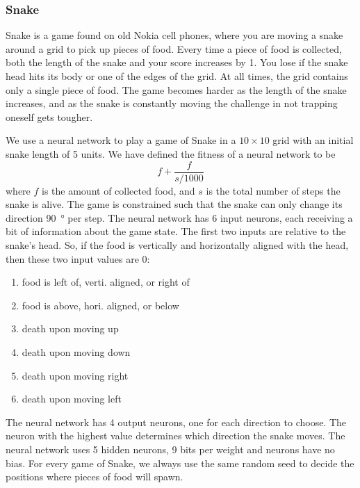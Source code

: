 \subsubsection{Snake}
Snake is a game found on old Nokia cell phones, where you are moving a snake around a grid to pick up pieces of food.
Every time a piece of food is collected, both the length of the snake and your score increases by 1.
You lose if the snake head hits its body or one of the edges of the grid.
At all times, the grid contains only a single piece of food.
The game becomes harder as the length of the snake increases, and as the snake is constantly moving the challenge in not trapping oneself gets tougher.

We use a neural network to play a game of Snake in a $10\times10$ grid with an initial snake length of 5 units.
We have defined the fitness of a neural network to be 
\[
  f + \frac{f}{s/1000}
\]
where $f$ is the amount of collected food, and $s$ is the total number of steps the snake is alive. The game is constrained such that the snake can only change its direction \SI{90}{\degree} per step. The neural network has 6 input neurons, each receiving a bit of information about the game state. The first two inputs are relative to the snake's head. So, if the food is vertically and horizontally aligned with the head, then these two input values are 0:
\begin{enumerate}
  \item {} food is left of, verti. aligned, or right of
  \item {} food is above, hori. aligned, or below
  \item {} death upon moving up 
  \item {} death upon moving down 
  \item {} death upon moving right
  \item {} death upon moving left 
\end{enumerate}
The neural network has 4 output neurons, one for each direction to choose. The neuron with the highest value determines which direction the snake moves.
The neural network uses 5 hidden neurons, 9 bits per weight and neurons have no bias.
For every game of Snake, we always use the same random seed to decide the positions where pieces of food will spawn.
